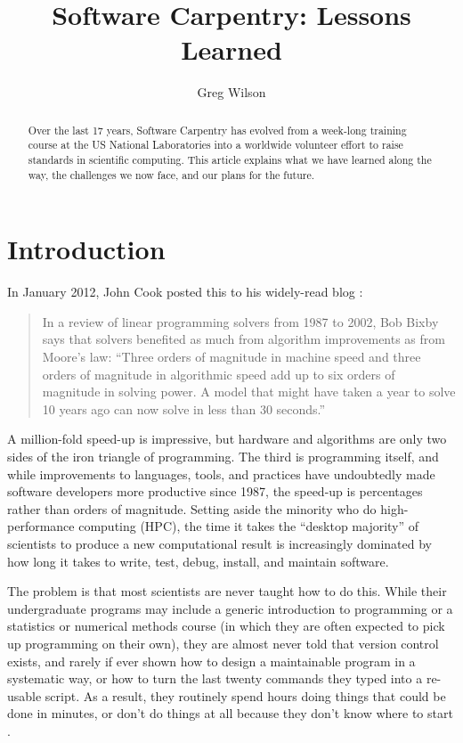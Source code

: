\documentclass[10pt,a4paper,twocolumn]{article}
\begin{document}
\title{Software Carpentry: Lessons Learned}
\author[1]{Greg Wilson}

\maketitle
\thispagestyle{fancy}

\begin{abstract}

Over the last 17 years, Software Carpentry has evolved from a week-long
training course at the US National Laboratories into a worldwide
volunteer effort to raise standards in scientific computing. This
article explains what we have learned along the way, the challenges we
now face, and our plans for the future.

\end{abstract}
\clearpage

\section*{Introduction}

In January 2012, John Cook posted this to his widely-read blog
\cite{cook2012}:

\begin{quote}
In a review of linear programming solvers from 1987 to 2002, Bob Bixby
says that solvers benefited as much from algorithm improvements as from
Moore's law: ``Three orders of magnitude in machine speed and three
orders of magnitude in algorithmic speed add up to six orders of
magnitude in solving power. A model that might have taken a year to
solve 10 years ago can now solve in less than 30 seconds.''
\end{quote}

A million-fold speed-up is impressive, but hardware and algorithms are
only two sides of the iron triangle of programming. The third is
programming itself, and while improvements to languages, tools, and
practices have undoubtedly made software developers more productive
since 1987, the speed-up is percentages rather than orders of magnitude.
Setting aside the minority who do high-performance computing (HPC), the
time it takes the ``desktop majority'' of scientists to produce a new
computational result is increasingly dominated by how long it takes to
write, test, debug, install, and maintain software.

The problem is that most scientists are never taught how to do this. While
their undergraduate programs may include a generic introduction to
programming or a statistics or numerical methods course (in which
they are often expected to pick up programming on their own), they are
almost never told that version control exists, and rarely if ever shown
how to design a maintainable program in a systematic way, or how to turn
the last twenty commands they typed into a re-usable script. As a
result, they routinely spend hours doing things that could be done in
minutes, or don't do things at all because they don't know where to
start \cite{hannay2009,prabhu2011}.
\end{document}
